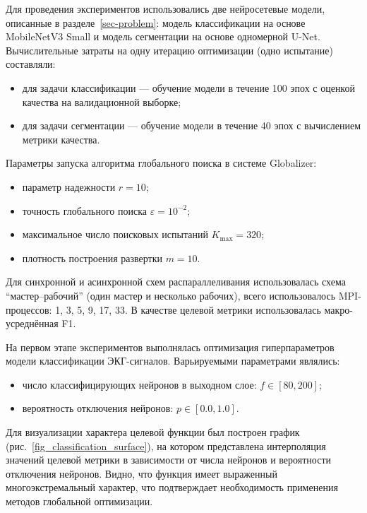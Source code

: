 \documentclass[10pt,a4paper]{book}
\begin{document}
Для проведения экспериментов использовались две нейросетевые модели, описанные в разделе~\ref{sec-problem}: модель классификации на основе MobileNetV3 Small и модель сегментации на основе одномерной U-Net. Вычислительные затраты на одну итерацию оптимизации (одно испытание) составляли:
\begin{itemize}
    \item для задачи классификации --- обучение модели в течение 100 эпох с оценкой качества на валидационной выборке;
    \item для задачи сегментации --- обучение модели в течение 40 эпох с вычислением метрики качества.
\end{itemize}


Параметры запуска алгоритма глобального поиска в системе Globalizer:
\begin{itemize}
    \item параметр надежности $r = 10$;
    \item точность глобального поиска $\varepsilon = 10^{-2}$;
    \item максимальное число поисковых испытаний $K_{\max} = 320$;
    \item плотность построения развертки $m = 10$.
\end{itemize}

Для синхронной и асинхронной схем распараллеливания использовалась схема ``мастер--рабочий'' (один мастер и несколько рабочих), всего использовалось MPI-процессов: 1, 3, 5, 9, 17, 33. В качестве целевой метрики использовалась макро-усреднённая F1.

На первом этапе экспериментов выполнялась оптимизация гиперпараметров модели классификации ЭКГ-сигналов. Варьируемыми параметрами являлись:
\begin{itemize}
    \item число классифицирующих нейронов в выходном слое: $f \in [80, 200]$;
    \item вероятность отключения нейронов: $p \in [0.0, 1.0]$.
\end{itemize}

Для визуализации характера целевой функции был построен график (рис.~\ref{fig_classification_surface}), на котором представлена интерполяция значений целевой метрики в зависимости от числа нейронов и вероятности отключения нейронов. Видно, что функция имеет выраженный многоэкстремальный характер, что подтверждает необходимость применения методов глобальной оптимизации.
\end{document}

